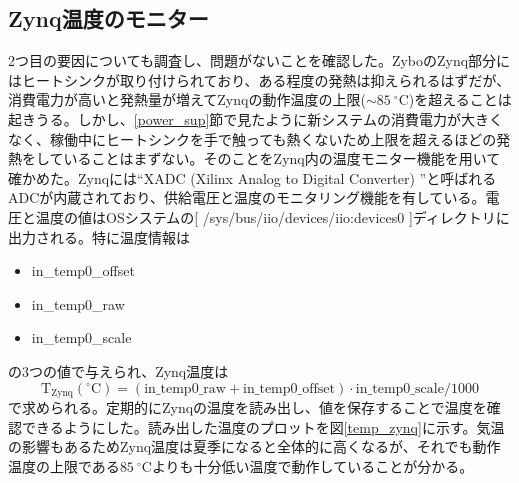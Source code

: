 \subsection{Zynq温度のモニター}
2つ目の要因についても調査し、問題がないことを確認した。ZyboのZynq部分にはヒートシンクが取り付けられており、ある程度の発熱は抑えられるはずだが、消費電力が高いと発熱量が増えてZynqの動作温度の上限($\sim\SI{85}{^{\circ}}$C)を超えることは起きうる。しかし、\ref{power_sup}節で見たように新システムの消費電力が大きくなく、稼働中にヒートシンクを手で触っても熱くないため上限を超えるほどの発熱をしていることはまずない。そのことをZynq内の温度モニター機能を用いて確かめた。Zynqには``XADC (Xilinx Analog to Digital Converter) \cite{xadc}''と呼ばれるADCが内蔵されており、供給電圧と温度のモニタリング機能を有している。電圧と温度の値はOSシステムの[ /sys/bus/iio/devices/iio:devices0 ]ディレクトリに出力される。特に温度情報は
\begin{itemize}
  \item in\_temp0\_offset
  \item in\_temp0\_raw
  \item in\_temp0\_scale
\end{itemize}
の3つの値で与えられ、Zynq温度は
\begin{equation}
  \mathrm{T}_{\mathrm{Zynq}}(^{\circ}\mathrm{C}) = (\mathrm{in\_temp0\_raw} + \mathrm{in\_temp0\_offset})\cdot \mathrm{in\_temp0\_scale} / 1000
\end{equation}
で求められる。定期的にZynqの温度を読み出し、値を保存することで温度を確認できるようにした。読み出した温度のプロットを図\ref{temp_zynq}に示す。気温の影響もあるためZynq温度は夏季になると全体的に高くなるが、それでも動作温度の上限である$\SI{85}{^{\circ}}$Cよりも十分低い温度で動作していることが分かる。


